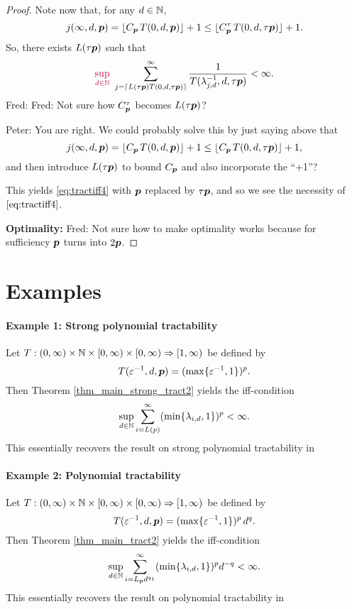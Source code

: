 \documentclass[11pt,a4paper]{article}
\newcommand{\fred}[1]{\begingroup\color{blue}Fred: #1\endgroup}
\newcommand{\peter}[1]{\begingroup\color{purple}#1\endgroup}
\begin{document}
\begin{proof}
Note now that, \peter{for any $d\in\mathbb{N}$,}
\[
 j(\infty,d,\boldsymbol{p}) = \lfloor C_{\boldsymbol{p}}\, T(0,d,\boldsymbol{p})\rfloor +1 \le \lfloor C_{\boldsymbol{p}}^\tau\, T(0,d,\tau \boldsymbol{p})\rfloor +1.
\]
So, there exists $L(\tau \boldsymbol{p})$ such that
\[
\peter{\sup_{d\in\naturals}}\,\, \sum_{j=\lceil L(\tau \vp) T(0,d,\tau \vp)\rceil}^\infty \frac{1}{T(\lambda_{j,d}^{-1},d, \tau\vp)}<\infty.
\]
\fred{Fred:  Not sure how $C_{\boldsymbol{p}}^\tau$ becomes $L(\tau \boldsymbol{p})$?}

\peter{Peter: You are right. We could probably solve this by just saying above that
\[
 j(\infty,d,\boldsymbol{p}) = \lfloor C_{\boldsymbol{p}}\, T(0,d,\boldsymbol{p})\rfloor +1 \le \lfloor C_{\boldsymbol{p}}\, T(0,d,\tau \boldsymbol{p})\rfloor +1,
\]
and then introduce $L(\tau \boldsymbol{p})$ to bound $C_{\boldsymbol{p}}$ and also incorporate the ``+1''?
}

This yields \eqref{eq:tractiff4} with $\boldsymbol{p}$ replaced by $\tau \boldsymbol{p}$, and so we see the necessity of $\eqref{eq:tractiff4}$.

\bigskip

\noindent \textbf{Optimality:}
\fred{Not sure how to make optimality works because for sufficiency $\boldsymbol{p}$ turns into $2\boldsymbol{p}$.}

\end{proof}


\section{Examples} \label{sec:examples}

\paragraph{Example 1: Strong polynomial tractability}

Let $T: (0,\infty) \times \mathbb{N} \times [0,\infty) \times [0,\infty)\Rightarrow [1,\infty)$
be defined by
\[
 T(\varepsilon^{-1},d,\boldsymbol{p})= (\max\{\varepsilon^{-1},1\})^p .
\]
Then Theorem \ref{thm_main_strong_tract2} yields the iff-condition
\[
 \sup_{d\in\mathbb{N}} \sum_{i=L(p)}^\infty (\min\{\lambda_{i,d},1\})^p < \infty.
\]
This essentially recovers the result on strong polynomial tractability in \cite[Theorem 5.1]{NW08}

\paragraph{Example 2: Polynomial tractability}

Let $T: (0,\infty) \times \mathbb{N} \times [0,\infty) \times [0,\infty)\Rightarrow [1,\infty)$
be defined by
\[
 T(\varepsilon^{-1},d,\boldsymbol{p})= (\max\{\varepsilon^{-1},1\})^p\, d^q.
\]
Then Theorem \ref{thm_main_tract2} yields the iff-condition
\[
 \sup_{d\in\mathbb{N}} \sum_{i=L_{\boldsymbol{p}} d^{q_1}}^\infty (\min\{\lambda_{i,d},1\})^p d^{-q} < \infty.
\]
This essentially recovers the result on polynomial tractability in \cite[Theorem 5.1]{NW08}
\end{document}
